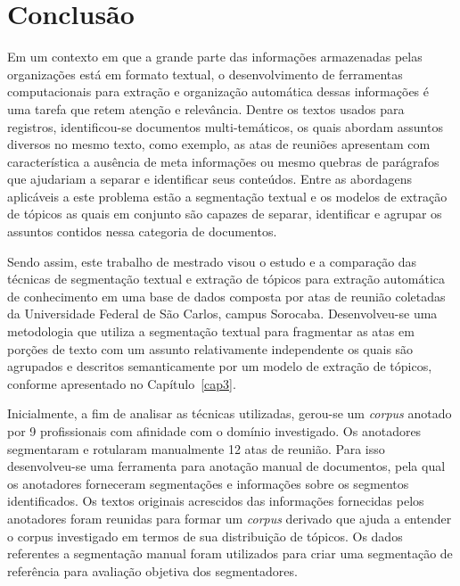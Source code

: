 \chapter*[Conclusão]{Conclusão}
\label{cap:conclusao}




Em um contexto em que a grande parte das informações armazenadas pelas organizações está em formato textual, o desenvolvimento de ferramentas computacionais para extração e organização automática dessas informações é uma tarefa que retem atenção e relevância.
Dentre os textos usados para registros, identificou-se documentos multi-temáticos, os quais abordam assuntos diversos no mesmo texto, como exemplo, as atas de reuniões apresentam com característica a ausência de meta informações ou mesmo quebras de parágrafos que ajudariam a separar e identificar seus conteúdos. 
Entre as abordagens aplicáveis a este problema estão a segmentação textual e os modelos de extração de tópicos as quais em conjunto são capazes de separar, identificar e agrupar os assuntos contidos nessa categoria de documentos.







Sendo assim, este trabalho de mestrado visou o estudo e a comparação das técnicas de segmentação textual e extração de tópicos para extração automática de conhecimento em uma base de dados composta por atas de reunião coletadas da Universidade Federal de São Carlos, campus Sorocaba. 
Desenvolveu-se uma metodologia que utiliza a segmentação textual para fragmentar as atas em porções de texto com um assunto relativamente independente os quais são agrupados e descritos semanticamente por um modelo de extração de tópicos, conforme apresentado no Capítulo~\ref{cap3}.

Inicialmente, a fim de analisar as técnicas utilizadas, gerou-se um \textit{corpus} anotado por 9 profissionais com afinidade com o domínio investigado. Os anotadores segmentaram e rotularam manualmente 12 atas de reunião. 
Para isso desenvolveu-se uma ferramenta para anotação manual de documentos, pela qual os anotadores forneceram segmentações e informações sobre os segmentos identificados.
Os textos originais acrescidos das informações fornecidas pelos anotadores foram reunidas para formar um \textit{corpus} derivado que ajuda a entender o corpus investigado em termos de sua distribuição de tópicos. Os dados referentes a segmentação manual foram utilizados para criar uma segmentação de referência para avaliação objetiva dos segmentadores. 

